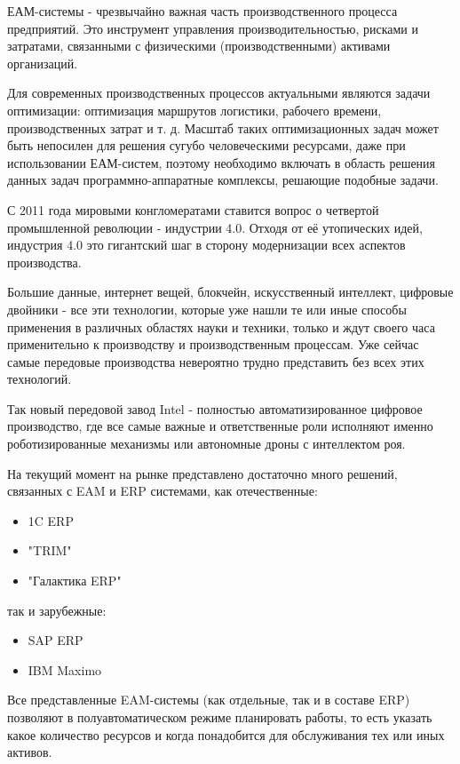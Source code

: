 
ЕАМ-системы - чрезвычайно важная часть производственного процесса предприятий. Это инструмент управления производительностью, рисками и затратами, связанными с физическими (производственными) активами организаций.

Для современных производственных процессов актуальными являются задачи
оптимизации: оптимизация маршрутов логистики, рабочего времени, производственных
затрат и т. д. Масштаб таких оптимизационных задач может быть непосилен для решения
сугубо человеческими ресурсами, даже при использовании ЕАМ-систем, поэтому необходимо включать в область решения данных задач программно-аппаратные комплексы, решающие подобные задачи.

С 2011 года мировыми конгломератами ставится вопрос о четвертой промышленной революции - индустрии 4.0. Отходя от её утопических идей, индустрия 4.0 это гигантский шаг в сторону модернизации всех аспектов производства.

Большие данные, интернет вещей, блокчейн, искусственный интеллект, цифровые двойники - все эти технологии, которые уже нашли те или иные способы применения в различных областях науки и техники, только и ждут своего часа применительно к производству и производственным процессам. Уже сейчас самые передовые производства невероятно трудно представить без всех этих технологий.

Так новый передовой завод Intel \cite{linusintel} - полностью автоматизированное цифровое производство, где все самые важные и ответственные роли исполняют именно роботизированные механизмы или автономные дроны с интеллектом роя.

На текущий момент на рынке представлено достаточно много решений, связанных с EAM и ERP системами,  как отечественные:

\begin{itemize}
	\item 1C ERP
	\item "TRIM"
	\item "Галактика ERP"
\end{itemize}

так и зарубежные:

\begin{itemize}
	\item SAP ERP
	\item IBM Maximo
\end{itemize}

Все представленные EAM-системы (как отдельные, так и в составе ERP) позволяют в полуавтоматическом режиме планировать работы, то есть указать какое количество ресурсов и когда понадобится для обслуживания тех или иных активов.

